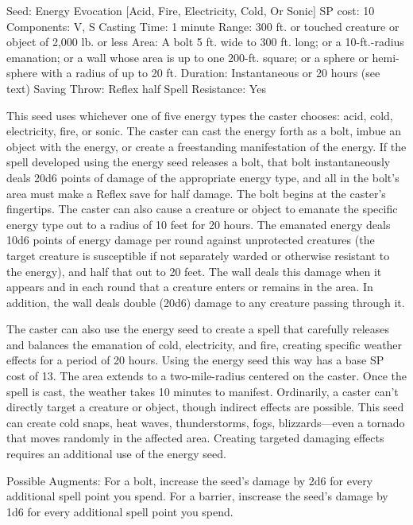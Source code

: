Seed: Energy
Evocation [Acid, Fire, Electricity, Cold, Or Sonic]
SP cost: 10
Components: V, S
Casting Time: 1 minute
Range: 300 ft. or touched creature or object of 2,000 lb. or less
Area: A bolt 5 ft. wide to 300 ft. long; or a 10-ft.-radius emanation; or a wall whose area is up to one 200-ft. square; or a sphere or hemi-sphere with a radius of up to 20 ft.
Duration: Instantaneous or 20 hours (see text)
Saving Throw: Reflex half
Spell Resistance: Yes

This seed uses whichever one of five energy types the caster chooses: acid, cold, electricity, fire, or sonic. 
The caster can cast the energy forth as a bolt, imbue an object with the energy, or create a freestanding manifestation of the energy. 
If the spell developed using the energy seed releases a bolt, that bolt instantaneously deals 20d6 points of damage of the appropriate energy type, and all in the bolt's area must make a Reflex save for half damage. 
The bolt begins at the caster's fingertips. 
The caster can also cause a creature or object to emanate the specific energy type out to a radius of 10 feet for 20 hours. 
The emanated energy deals 10d6 points of energy damage per round against unprotected creatures (the target creature is susceptible if not separately warded or otherwise resistant to the energy), and half that out to 20 feet. The wall deals this damage when it appears and in each round that a creature enters or remains in the area. In addition, the wall deals double (20d6) damage to any creature passing through it.

The caster can also use the energy seed to create a spell that carefully releases and balances the emanation of cold, electricity, and fire, creating specific weather effects for a period of 20 hours. 
Using the energy seed this way has a base SP cost of 13. 
The area extends to a two-mile-radius centered on the caster. Once the spell is cast, the weather takes 10 minutes to manifest. Ordinarily, a caster can't directly target a creature or object, though indirect effects are possible. This seed can create cold snaps, heat waves, thunderstorms, fogs, blizzards—even a tornado that moves randomly in the affected area. Creating targeted damaging effects requires an additional use of the energy seed.

Possible Augments: 
For a bolt, increase the seed's damage by 2d6 for every additional spell point you spend.
For a barrier, inscrease the seed's damage by 1d6 for every additional spell point you spend.